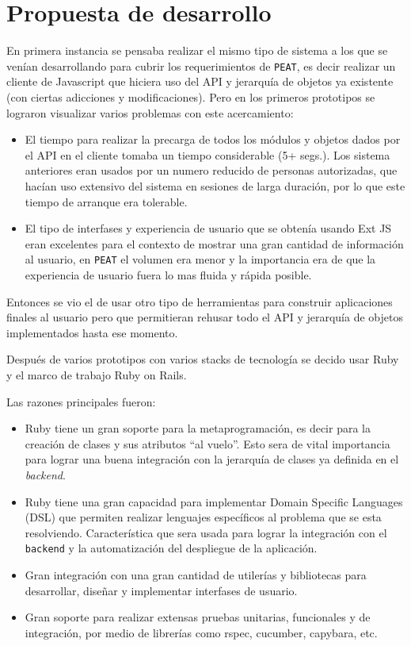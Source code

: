 \section{Propuesta de desarrollo}
En primera instancia se pensaba realizar el mismo tipo de sistema
a los que se venían desarrollando para cubrir los requerimientos
de \texttt{PEAT}, es decir realizar un cliente
de Javascript que hiciera uso del API y jerarquía de objetos ya
existente (con ciertas adicciones y modificaciones). Pero en los
primeros prototipos se lograron visualizar varios problemas con
este acercamiento:

\begin{itemize}
\item El tiempo para realizar la precarga de todos los módulos y
  objetos dados por el API en el cliente tomaba un tiempo
  considerable (5+ segs.). Los sistema anteriores eran usados
  por un numero reducido de personas autorizadas, que hacían uso
  extensivo del sistema en sesiones de larga duración, por lo
  que este tiempo de arranque era tolerable.
\item El tipo de interfases y experiencia de usuario que se obtenía
  usando Ext JS eran excelentes para el contexto de mostrar una gran
  cantidad de información al usuario, en \texttt{PEAT} el volumen
  era menor y la importancia era de que la experiencia de usuario
  fuera lo mas fluida y rápida posible.
\end{itemize}

Entonces se vio el de usar otro tipo de herramientas para construir
aplicaciones finales al usuario pero que permitieran rehusar todo el API
y jerarquía de objetos implementados hasta ese momento.

Después de varios prototipos con varios stacks de tecnología se decido
usar Ruby y el marco de trabajo Ruby on Rails.

Las razones principales fueron:
\begin{itemize}
\item Ruby tiene un gran soporte para la metaprogramación, es decir para la
  creación de clases y sus atributos ``al vuelo''. Esto sera de vital
  importancia para lograr una buena integración con la jerarquía de clases
  ya definida en el \textit{backend}.
\item Ruby tiene una gran capacidad para implementar Domain Specific Languages (DSL)
  que permiten realizar lenguajes específicos al problema que se esta resolviendo.
  Característica que sera usada para lograr la integración con el
  \texttt{backend} y la automatización del despliegue de la aplicación.
\item Gran integración con una gran cantidad de utilerías y bibliotecas para
  desarrollar, diseñar y implementar interfases de usuario.
\item Gran soporte para realizar extensas pruebas unitarias, funcionales
  y de integración, por medio de librerías como rspec, cucumber, capybara, etc.
\end{itemize}

